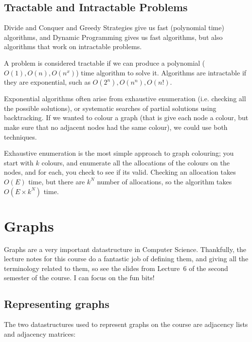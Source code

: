 \subsection{Tractable and Intractable Problems}

Divide and Conquer and Greedy Strategies give us fast (polynomial time)
algorithms, and Dynamic Programming gives us fast algorithms, but also
algorithms that work on intractable problems.

A problem is considered tractable if we can produce a polynomial ($O(1), O(n),
O(n^x)$) time algorithm to solve it. Algorithms are intractable if they are
exponential, such as $O(2^n), O(n^n), O(n!)$.

Exponential algorithms often arise from exhaustive enumeration (i.e. checking
all the possible solutions), or systematic searches of partial solutions using
backtracking. If we wanted to colour a graph (that is give each node a colour,
but make sure that no adjacent nodes had the same colour), we could use both
techniques.

Exhaustive enumeration is the most simple approach to graph colouring; you start
with $k$ colours, and enumerate all the allocations of the colours on the nodes,
and for each, you check to see if its valid. Checking an allocation takes $O(E)$
time,  but
there are $k^N$ number of allocations, so the algorithm takes $O(E \times k^N)$
time.

\section{Graphs}

Graphs are a very important datastructure in Computer Science. Thankfully, the
lecture notes for this course do a fantastic job of defining them, and giving
all the terminology related to them, so see the slides from Lecture~6 of the
second semester of the course. I can focus on the fun bits!

\subsection{Representing graphs}

The two datastructures used to represent graphs on the course are adjacency
lists and adjacency matrices:

